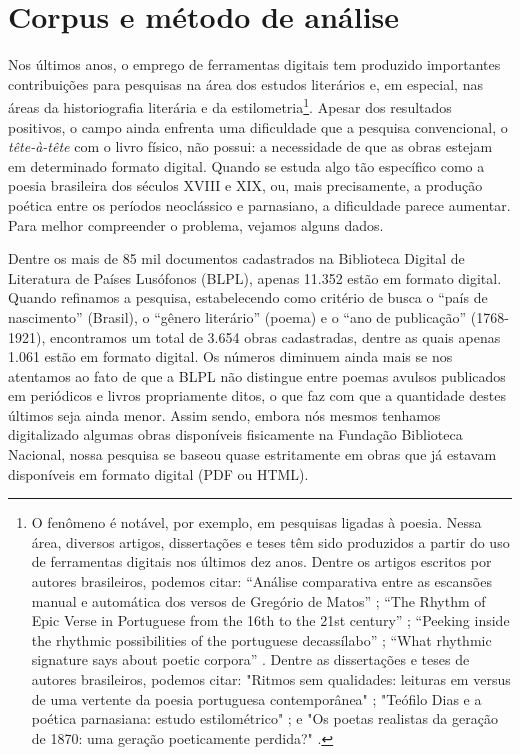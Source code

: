 \documentclass[portuguese]{textolivre}
\begin{document}
\section{Corpus e método de análise}\label{sec-normas}
Nos últimos anos, o emprego de ferramentas digitais tem produzido importantes contribuições para pesquisas na área dos estudos literários e, em especial, nas áreas da historiografia literária e da estilometria\footnote{O fenômeno é notável, por exemplo, em pesquisas ligadas à poesia. Nessa área, diversos artigos, dissertações e teses têm sido produzidos a partir do uso de ferramentas digitais nos últimos dez anos. Dentre os artigos escritos por autores brasileiros, podemos citar: “Análise comparativa entre as escansões manual e automática dos versos de Gregório de Matos” \cite{mittmann2017analise}; “The Rhythm of Epic Verse in Portuguese from the 16th to the 21st century” \cite{mittmann2018rhythm}; “Peeking inside the rhythmic possibilities of the portuguese decassílabo” \cite{mittmann2021peeking}; “What rhythmic signature says about poetic corpora” \cite{mittmann2019rhythmic}. Dentre as dissertações e teses de autores brasileiros, podemos citar: "Ritmos sem qualidades: leituras em versus de uma vertente da poesia portuguesa contemporânea" \cite{osorio2019ritmos}; "Teófilo Dias e a poética parnasiana: estudo estilométrico" \cite{sousa2023teofilo}; e "Os poetas realistas da geração de 1870: uma geração poeticamente perdida?" \cite{scarabelot2024poetas}.}. Apesar dos resultados positivos, o campo ainda enfrenta uma dificuldade que a pesquisa convencional, o \textit{tête-à-tête} com o livro físico, não possui: a necessidade de que as obras estejam em determinado formato digital. Quando se estuda algo tão específico como a poesia brasileira dos séculos XVIII e XIX, ou, mais precisamente, a produção poética entre os períodos neoclássico e parnasiano, a dificuldade parece aumentar. Para melhor compreender o problema, vejamos alguns dados.

Dentre os mais de 85 mil documentos cadastrados na Biblioteca Digital de Literatura de Países Lusófonos (BLPL), apenas 11.352 estão em formato digital. Quando refinamos a pesquisa, estabelecendo como critério de busca o “país de nascimento” (Brasil), o “gênero literário” (poema) e o “ano de publicação” (1768-1921), encontramos um total de 3.654 obras cadastradas, dentre as quais apenas 1.061 estão em formato digital. Os números diminuem ainda mais se nos atentamos ao fato de que a BLPL não distingue entre poemas avulsos publicados em periódicos e livros propriamente ditos, o que faz com que a quantidade destes últimos seja ainda menor. Assim sendo, embora nós mesmos tenhamos digitalizado algumas obras disponíveis fisicamente na Fundação Biblioteca Nacional, nossa pesquisa se baseou quase estritamente em obras que já estavam disponíveis em formato digital (PDF ou HTML).
\end{document}
